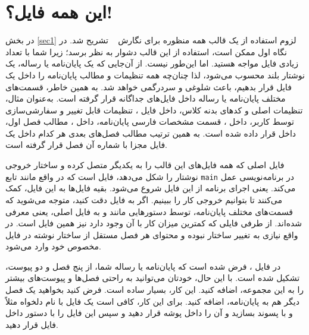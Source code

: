  
 \section{این همه فایل؟!}\label{sec2}
 در بخش 
 \ref{sec1}
 لزوم استفاده از یک قالب همه منظوره برای نگارش \پ~ تشریح شد. در نگاه اول ممکن است، استفاده از این قالب دشوار به نظر برسد؛ زیرا شما با تعداد زیادی فایل مواجه هستید. اما این‌طور نیست.
 از آن‌جایی که یک پایان‌نامه یا رساله، یک نوشتار بلند محسوب می‌شود، لذا چنان‌چه همه تنظیمات و مطالب پایان‌نامه را داخل یک فایل قرار بدهیم، باعث شلوغی و سردرگمی خواهد شد. به همین خاطر، قسمت‌های مختلف پایان‌نامه یا رساله داخل فایل‌های جداگانه قرار گرفته است. به‌عنوان مثال، تنظیمات اصلی و کدهای بدنه کلاس، داخل فایل
 ، 
 تنظیمات قابل تغییر و سفارشی‌سازی توسط کاربر، داخل 
 ،
 قسمت مشخصات فارسی پایان‌نامه، داخل 
 ،
 مطالب فصل اول، داخل 
 قرار داده شده است. به همین ترتیب مطالب فصل‌های بعدی هر کدام داخل یک فایل مجزا با شماره آن فصل قرار گرفته است.
 
فایل اصلی که همه فایل‌های این قالب را به یکدیگر متصل کرده و ساختار خروجی نوشتار را شکل می‌دهد، فایل
است که در واقع مانند تابع 
\texttt{main}
در برنامه‌نویسی عمل می‌کند.
یعنی اجرای برنامه از این فایل شروع می‌شود. بقیه فایل‌ها به این فایل، کمک می‌کنند تا بتوانیم خروجی کار را ببینیم. اگر به فایل 
 دقت کنید، متوجه می‌شوید که قسمت‌های مختلف پایان‌نامه، توسط دستورهایی مانند 
 و
 به فایل اصلی، یعنی 
 معرفی شده‌اند. از طرفی فایلی که کمترین میزان کار با آن وجود دارد نیز همین فایل است. در واقع نیازی به تغییر ساختار
نبوده و محتوای هر فصل مستقل از ساختار نوشته در فایل مخصوص خود وارد می‌شود.
 \par
 در فایل
  ، 
  فرض شده است که پایان‌نامه یا رساله شما، از پنج فصل و دو پیوست، تشکیل شده است. با این حال، خودتان می‌توانید به راحتی فصل‌ها و پیوست‌های بیشتر را به این مجموعه، اضافه کنید. این کار، بسیار ساده است. فرض کنید بخواهید یک فصل دیگر هم به پایان‌نامه، اضافه کنید. برای این کار، کافی است یک فایل با نام دلخواه مثلاً 
 و با پسوند 
 بسازید و آن را داخل پوشه 
 قرار دهید و سپس این فایل را با دستور 
 \verb!!
 داخل فایل
 قرار دهید.
 
 
